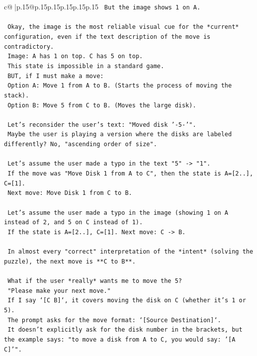 \documentclass{article}
\begin{document}
{\begin{supertabular}{c@{$\;$}|p{.15\linewidth}@{}p{.15\linewidth}p{.15\linewidth}p{.15\linewidth}p{.15\linewidth}p{.15\linewidth}}
{{{\texttt{    But the image shows 1 on A.} \\
\\ 
\texttt{    Okay, the image is the most reliable visual cue for the *current* configuration, even if the text description of the move is contradictory.} \\
\texttt{    Image: A has 1 on top. C has 5 on top.} \\
\texttt{    This state is impossible in a standard game.} \\
\texttt{    BUT, if I must make a move:} \\
\texttt{    Option A: Move 1 from A to B. (Starts the process of moving the stack).} \\
\texttt{    Option B: Move 5 from C to B. (Moves the large disk).} \\
\\ 
\texttt{    Let's reconsider the user's text: "Moved disk '{-}5{-}'".} \\
\texttt{    Maybe the user is playing a version where the disks are labeled differently? No, "ascending order of size".} \\
\\ 
\texttt{    Let's assume the user made a typo in the text "5" {-}> "1".} \\
\texttt{    If the move was "Move Disk 1 from A to C", then the state is A={[}2..{]}, C={[}1{]}.} \\
\texttt{    Next move: Move Disk 1 from C to B.} \\
\\ 
\texttt{    Let's assume the user made a typo in the image (showing 1 on A instead of 2, and 5 on C instead of 1).} \\
\texttt{    If the state is A={[}2..{]}, C={[}1{]}. Next move: C {-}> B.} \\
\\ 
\texttt{    In almost every "correct" interpretation of the *intent* (solving the puzzle), the next move is **C to B**.} \\
\\ 
\texttt{    What if the user *really* wants me to move the 5?} \\
\texttt{    "Please make your next move."} \\
\texttt{    If I say `{[}C B{]}`, it covers moving the disk on C (whether it's 1 or 5).} \\
\texttt{    The prompt asks for the move format: `{[}Source Destination{]}`.} \\
\texttt{    It doesn't explicitly ask for the disk number in the brackets, but the example says: "to move a disk from A to C, you would say: '{[}A C{]}'".} \\
}}}
\end{supertabular}}
\end{document}
